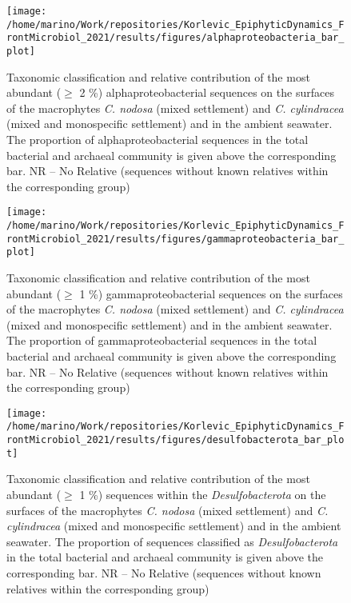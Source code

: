 \documentclass[
  12pt,
]{article}
\begin{document}
\begin{figure}[H]

{\centering \texttt{[image: /home/marino/Work/repositories/Korlevic\_EpiphyticDynamics\_FrontMicrobiol\_2021/results/figures/alphaproteobacteria\_bar\_plot]} 

}

\caption{Taxonomic classification and relative contribution of the most abundant ($\geq$ 2 \si{\percent}) alphaproteobacterial sequences on the surfaces of the macrophytes \textit{C. nodosa} (mixed settlement) and \textit{C. cylindracea} (mixed and monospecific settlement) and in the ambient seawater. The proportion of alphaproteobacterial sequences in the total bacterial and archaeal community is given above the corresponding bar. NR -- No Relative (sequences without known relatives within the corresponding group)\label{alpha}}\label{fig:unnamed-chunk-7}
\end{figure}

\begin{figure}[H]

{\centering \texttt{[image: /home/marino/Work/repositories/Korlevic\_EpiphyticDynamics\_FrontMicrobiol\_2021/results/figures/gammaproteobacteria\_bar\_plot]} 

}

\caption{Taxonomic classification and relative contribution of the most abundant ($\geq$ 1 \si{\percent}) gammaproteobacterial sequences on the surfaces of the macrophytes \textit{C. nodosa} (mixed settlement) and \textit{C. cylindracea} (mixed and monospecific settlement) and in the ambient seawater. The proportion of gammaproteobacterial sequences in the total bacterial and archaeal community is given above the corresponding bar. NR -- No Relative (sequences without known relatives within the corresponding group)\label{gamma}}\label{fig:unnamed-chunk-8}
\end{figure}

\begin{figure}[H]

{\centering \texttt{[image: /home/marino/Work/repositories/Korlevic\_EpiphyticDynamics\_FrontMicrobiol\_2021/results/figures/desulfobacterota\_bar\_plot]} 

}

\caption{Taxonomic classification and relative contribution of the most abundant ($\geq$ 1 \si{\percent}) sequences within the \textit{Desulfobacterota} on the surfaces of the macrophytes \textit{C. nodosa} (mixed settlement) and \textit{C. cylindracea} (mixed and monospecific settlement) and in the ambient seawater. The proportion of sequences classified as \textit{Desulfobacterota} in the total bacterial and archaeal community is given above the corresponding bar. NR -- No Relative (sequences without known relatives within the corresponding group)\label{desulfo}}\label{fig:unnamed-chunk-9}
\end{figure}
\end{document}
